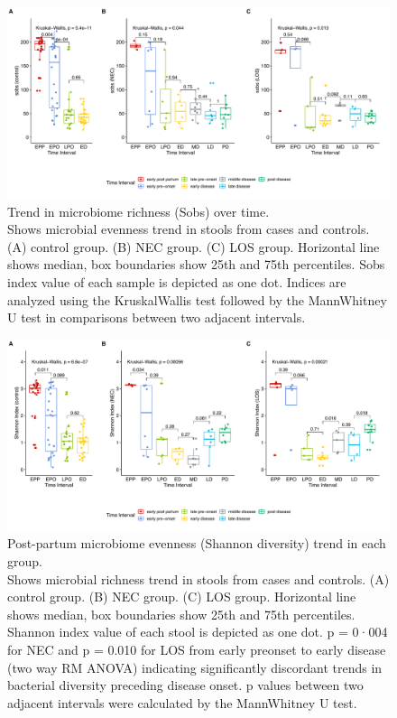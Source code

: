 \documentclass[fleqn,10pt]{wlpeerj} %
\begin{document}
\begin{figure}[ht]\centering
  \includegraphics[width=\linewidth]{sobs-group-time2.pdf}
  \caption{Trend in microbiome richness (Sobs) over time. \\  Shows microbial evenness trend in stools from cases and controls. (A) control group.  (B) NEC group. (C) LOS group. Horizontal line shows median, box boundaries show 25th and 75th percentiles. Sobs index value of each sample is depicted as one dot. Indices are analyzed using the Kruskal\-Wallis test followed by the Mann\-Whitney U test in comparisons between two adjacent intervals.}
  \label{fig:sobs-group-time}
\end{figure}

\begin{figure}[ht]\centering
  \includegraphics[width=\linewidth]{Shannon-group-time2.pdf}
  \caption{Post-partum microbiome evenness (Shannon diversity) trend in each group. \\ Shows microbial richness trend in stools from cases and controls. (A) control group. (B) NEC group. (C) LOS group. Horizontal line shows median, box boundaries show 25th and 75th percentiles. Shannon index value of each stool is depicted as one dot. p = 0·004 for NEC and p = 0.010 for LOS from early pre\-onset to early disease (two way RM ANOVA) indicating significantly discordant trends in bacterial diversity preceding disease onset. p values between two adjacent intervals were calculated by the Mann\-Whitney U test. }
  \label{fig:Shannon-group-time}
\end{figure}
\end{document}
